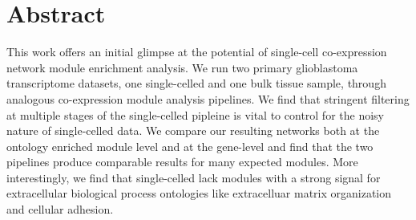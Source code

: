 \documentclass[10pt,letterpaper]{article}
\begin{document}
\section*{Abstract}
This work offers an initial glimpse at the potential of single-cell co-expression network module enrichment analysis. We run two primary glioblastoma transcriptome datasets, one single-celled and one bulk tissue sample, through analogous co-expression module analysis pipelines. We find that stringent filtering at multiple stages of the single-celled pipleine is vital to control for the noisy nature of single-celled data. We compare our resulting networks both at the ontology enriched module level and at the gene-level and find that the two pipelines produce comparable results for many expected modules. More interestingly, we find that single-celled lack modules with a strong signal for extracellular biological process ontologies like extracelluar matrix organization and cellular adhesion. 


\linenumbers
\end{document}
